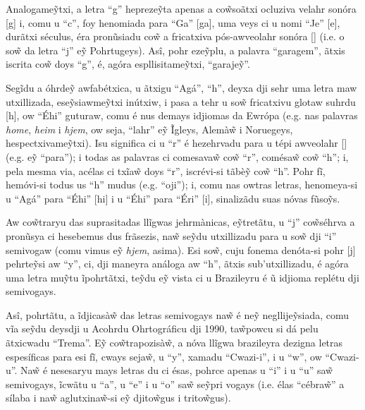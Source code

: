 \documentclass[12pt, a5paper, titlepage]{article}
\begin{document}
\begin{bilingualpages}
    Analogame\~ytxi, a letra ``g'' hepreze\~yta apenas a co\~wsoãtxi ocluziva
    velahr sonóra [g] i, comu u ``c'', foy henomiada para ``Ga'' [ga], uma veys ci
    u nomi ``Je'' [\textyogh e], durãtxi séculus, éra pronũsiadu co\~w a fricatxiva
    pós-awveolahr sonóra [\textyogh] (i.e. o so\~w da letra ``j'' e\~y Pohrtugeys).
    Asî, pohr eze\~yplu, a palavra ``garagem'', ãtxis iscrita co\~w doys ``g'', é,
    agóra espllisitame\~ytxi, ``garaje\~y''.

    Segĩdu a óhrde\~y awfabétxica, u ãtxigu ``Agá'', ``h'', deyxa dji sehr uma
    letra maw utxillizada, ese\~ysiawme\~ytxi inútxiw, i pasa a tehr u so\~w
    fricatxivu glotaw suhrdu [h], ow ``Éhi'' guturaw, comu é nus demays idjiomas da
    Ewrópa (e.g. nas palavras \textit{home}, \textit{heim} i \textit{hjem}, ow
    seja, ``lahr'' e\~y Ĩgleys, Alemà\~w i Noruegeys, hespectxivame\~ytxi). Isu
    significa ci u ``r'' é hezehrvadu para u tépi awveolahr [\textfishhookr] (e.g.
    e\~y ``para''); i todas as palavras ci comesava\~w co\~w ``r'', comésa\~w co\~w
    ``h''; i, pela mesma via, acélas ci txĩa\~w doys ``r'', iscrévi-si tãbè\~y
    co\~w ``h''. Pohr fĩ, hemóvi-si todus us ``h'' mudus (e.g. ``oji''); i, comu
    nas owtras letras, henomeya-si u ``Agá'' para ``Éhi'' [\textepsilon hi] i u
    ``Éhi'' para ``Éri'' [\textepsilon \textfishhookr i], sinalizãdu suas nóvas
    fũso\~ys.

    Aw co\~wtraryu das suprasitadas llĩgwas jehrmànicas, e\~ytretãtu, u ``j''
    co\~wséhrva a pronũsya ci hesebemus dus frãsezis, na\~w se\~ydu utxillizadu
    para u so\~w dji ``i'' semivogaw (comu vimus e\~y \textit{hjem}, asima). Esi
    so\~w, cuju fonema denóta-si pohr [j] pehrte\~ysi aw ``y'', ci, dji maneyra
    análoga aw ``h'', ãtxis sub'utxillizadu, é agóra uma letra mu\~ytu ĩpohrtãtxi,
    te\~ydu e\~y vista ci u Brazileyru é ũ idjioma replétu dji semivogays.

    Asî, pohrtãtu, a ĩdjicasà\~w das letras semivogays na\~w é ne\~y
    negllije\~ysiada, comu vĩa se\~ydu deysdji u Acohrdu Ohrtográficu dji 1990,
    ta\~wpowcu si dá pelu ãtxicwadu ``Trema''. E\~y co\~wtrapozisà\~w, a nóva
    llĩgwa brazileyra dezigna letras espesíficas para esi fĩ, cways seja\~w, u
    ``y'', xamadu ``Cwazi-i'', i u ``w'', ow ``Cwazi-u''. Na\~w é nesesaryu mays
    letras du ci ésas, pohrce apenas u ``i'' i u ``u'' sa\~w semivogays, ĩcwãtu u
    ``a'', u ``e'' i u ``o'' sa\~w se\~ypri vogays (i.e. élas ``cébra\~w'' a sílaba
    i na\~w aglutxina\~w-si e\~y djito\~wgus i trito\~wgus).


\end{bilingualpages}
\end{document}
